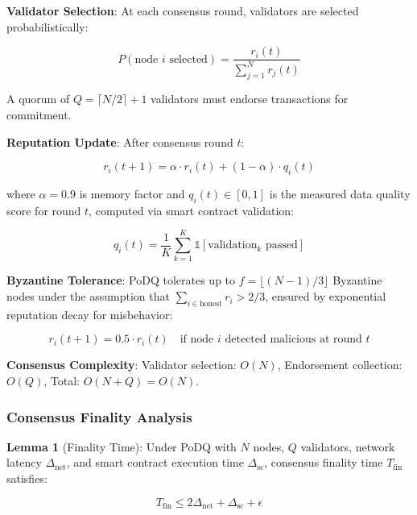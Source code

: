 \documentclass[times,10pt,twocolumn]{jucs2e}
\begin{document}
\textbf{Validator Selection}: At each consensus round, validators are selected probabilistically:

\begin{equation}
P(\text{node } i \text{ selected}) = \frac{r_i(t)}{\sum_{j=1}^N r_j(t)}
\end{equation}

A quorum of $Q = \lceil N/2 \rceil + 1$ validators must endorse transactions for commitment.

\textbf{Reputation Update}: After consensus round $t$:

\begin{equation}
r_i(t+1) = \alpha \cdot r_i(t) + (1-\alpha) \cdot q_i(t)
\end{equation}

where $\alpha = 0.9$ is memory factor and $q_i(t) \in [0,1]$ is the measured data quality score for round $t$, computed via smart contract validation:

\begin{equation}
q_i(t) = \frac{1}{K} \sum_{k=1}^K \mathbb{1}[\text{validation}_k \text{ passed}]
\end{equation}

\textbf{Byzantine Tolerance}: PoDQ tolerates up to $f = \lfloor (N-1)/3 \rfloor$ Byzantine nodes under the assumption that $\sum_{i \in \text{honest}} r_i > 2/3$, ensured by exponential reputation decay for misbehavior:

\begin{equation}
r_i(t+1) = 0.5 \cdot r_i(t) \quad \text{if node } i \text{ detected malicious at round } t
\end{equation}

\textbf{Consensus Complexity}: Validator selection: $O(N)$, Endorsement collection: $O(Q)$, Total: $O(N + Q) = O(N)$.

\subsubsection{Consensus Finality Analysis}

\textbf{Lemma 1} (Finality Time): Under PoDQ with $N$ nodes, $Q$ validators, network latency $\Delta_{\text{net}}$, and smart contract execution time $\Delta_{\text{sc}}$, consensus finality time $T_{\text{fin}}$ satisfies:

\begin{equation}
T_{\text{fin}} \leq 2\Delta_{\text{net}} + \Delta_{\text{sc}} + \epsilon
\end{equation}
\end{document}
